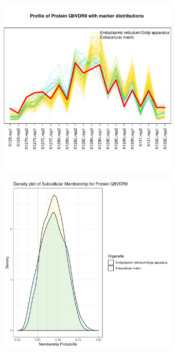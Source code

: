 \documentclass[12pt,english]{article}\usepackage[]{graphicx}\usepackage[]{color}
\makeatletter
\def\maxwidth{ %
  \ifdim\Gin@nat@width>\linewidth
    \linewidth
  \else
    \Gin@nat@width
  \fi
}
\newenvironment{knitrout}{}{} %
\makeatother
\begin{document}
\begin{figure}[p]
\begin{subfigure}[t]{0.5\textwidth}
\begin{knitrout}
{\centering \includegraphics[width=\maxwidth]{figure/Q8VDR9-prof-1} 

}



\end{knitrout}
    \caption{}
  \end{subfigure}
  \vspace{1cm}
  \begin{subfigure}[t]{0.5\textwidth}
    \centering
\begin{knitrout}
\color{fgcolor}

{\centering \includegraphics[width=\maxwidth]{figure/Q8VDR9-dens-1} 

}
\end{knitrout}
\end{subfigure}
\end{figure}
\end{document}
